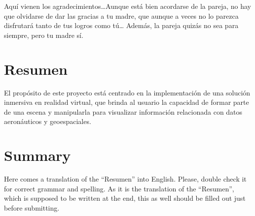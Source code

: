 \documentclass[a4paper, 11pt]{book}
\begin{document}
Aquí vienen los agradecimientos\ldots Aunque está bien acordarse de la pareja, no hay que olvidarse de dar las gracias a tu madre, que aunque a veces no lo parezca disfrutará tanto de tus logros como tú\ldots 
Además, la pareja quizás no sea para siempre, pero tu madre sí.


\chapter*{Resumen}

El propósito de este proyecto está centrado en la implementación de una solución inmersiva en realidad virtual, que brinda al usuario la capacidad de formar parte de una escena y manipularla para visualizar  información relacionada con datos aeronáuticos y geoespaciales.


\chapter*{Summary}

Here comes a translation of the ``Resumen'' into English. 
Please, double check it for correct grammar and spelling.
As it is the translation of the ``Resumen'', which is supposed to be written at the end, this as well should be filled out just before submitting.




\tableofcontents 
\cleardoublepage
\listoffigures %
\end{document}
